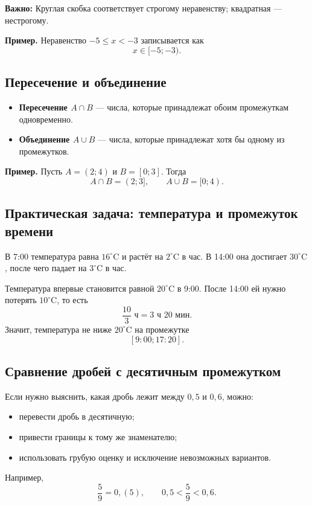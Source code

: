 \documentclass[a4paper,12pt]{article}
\newcommand{\key}[1]{\textbf{\color{darkaccent}#1}}
\newcommand{\warn}[1]{\textbf{\color{accent}Важно:} #1}
\begin{document}
\warn{Круглая скобка соответствует строгому неравенству; квадратная --- нестрогому.}

\textbf{Пример.} Неравенство $-5\le x<-3$ записывается как
\[
 x\in[-5;-3).
\]

\begin{center}
\end{center}

\subsection*{Пересечение и объединение}
\begin{itemize}
  \item \key{Пересечение $A\cap B$} --- числа, которые принадлежат обоим промежуткам одновременно.
  \item \key{Объединение $A\cup B$} --- числа, которые принадлежат хотя бы одному из промежутков.
\end{itemize}

\textbf{Пример.} Пусть $A=(2;4)$ и $B=[0;3]$. Тогда
\[
A\cap B=(2;3],\qquad A\cup B=[0;4).
\]

\subsection*{Практическая задача: температура и промежуток времени}
В 7:00 температура равна $16^\circ\!\mathrm{C}$ и растёт на $2^\circ\!\mathrm{C}$ в час. В 14:00 она достигает $30^\circ\!\mathrm{C}$, после чего падает на $3^\circ\!\mathrm{C}$ в час.

Температура впервые становится равной $20^\circ\!\mathrm{C}$ в 9:00. После 14:00 ей нужно потерять $10^\circ\!\mathrm{C}$, то есть
\[
\frac{10}{3}\text{ ч}=3\text{ ч }20\text{ мин}.
\]
Значит, температура не ниже $20^\circ\!\mathrm{C}$ на промежутке
\[
\boxed{[9{:}00;17{:}20]}.
\]

\subsection*{Сравнение дробей с десятичным промежутком}
Если нужно выяснить, какая дробь лежит между $0,5$ и $0,6$, можно:
\begin{itemize}
  \item перевести дробь в десятичную;
  \item привести границы к тому же знаменателю;
  \item использовать грубую оценку и исключение невозможных вариантов.
\end{itemize}
Например,
\[
\frac{5}{9}=0,(5),\qquad 0,5<\frac{5}{9}<0,6.
\]
\end{document}
